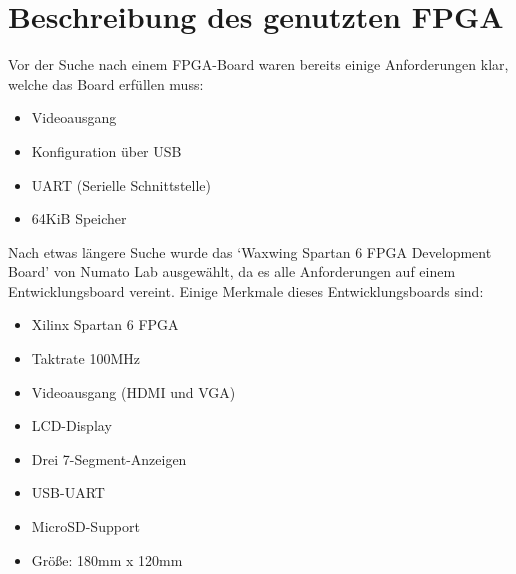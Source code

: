 \section{Beschreibung des genutzten FPGA}
Vor der Suche nach einem FPGA-Board waren bereits einige Anforderungen klar,
welche das Board erfüllen muss:
\begin{itemize}
	\item Videoausgang
	\item Konfiguration über USB
	\item \acs{UART} (Serielle Schnittstelle)
	\item 64KiB Speicher
\end{itemize}
Nach etwas längere Suche wurde das `Waxwing Spartan 6 FPGA Development Board'
von Numato Lab ausgewählt, da es alle Anforderungen auf einem Entwicklungsboard
vereint. Einige Merkmale dieses Entwicklungsboards sind:
\begin{itemize}
	\item Xilinx Spartan 6 FPGA
	\item Taktrate 100MHz
	\item Videoausgang (HDMI und VGA)
	\item LCD-Display
	\item Drei 7-Segment-Anzeigen
	\item USB-UART
	\item MicroSD-Support
	\item Größe: 180mm x 120mm
\end{itemize}
